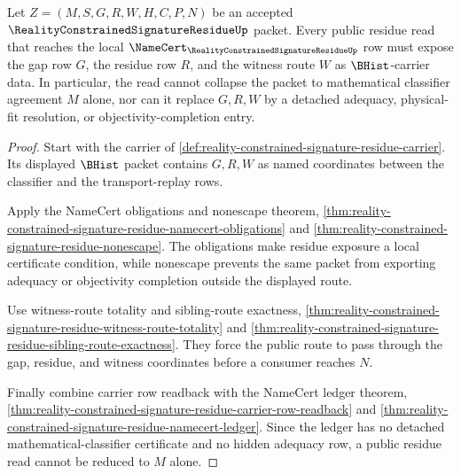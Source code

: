 \begin{theorem}
\label{thm:reality-constrained-signature-residue-gap-row-exhaustion}
Let $Z=(M,S,G,R,W,H,C,P,N)$ be an accepted $\RealityConstrainedSignatureResidueUp$ packet. Every public residue read that reaches the local $\NameCert_{\RealityConstrainedSignatureResidueUp}$ row must expose the gap row $G$, the residue row $R$, and the witness route $W$ as $\BHist$-carrier data. In particular, the read cannot collapse the packet to mathematical classifier agreement $M$ alone, nor can it replace $G,R,W$ by a detached adequacy, physical-fit resolution, or objectivity-completion entry.
\end{theorem}
\begin{proof}
Start with the carrier of \autoref{def:reality-constrained-signature-residue-carrier}. Its displayed $\BHist$ packet contains $G,R,W$ as named coordinates between the classifier and the transport-replay rows.

Apply the NameCert obligations and nonescape theorem,
\autoref{thm:reality-constrained-signature-residue-namecert-obligations} and
\autoref{thm:reality-constrained-signature-residue-nonescape}. The obligations make residue exposure a local certificate condition, while nonescape prevents the same packet from exporting adequacy or objectivity completion outside the displayed route.

Use witness-route totality and sibling-route exactness,
\autoref{thm:reality-constrained-signature-residue-witness-route-totality} and
\autoref{thm:reality-constrained-signature-residue-sibling-route-exactness}. They force the public route to pass through the gap, residue, and witness coordinates before a consumer reaches $N$.

Finally combine carrier row readback with the NameCert ledger theorem,
\autoref{thm:reality-constrained-signature-residue-carrier-row-readback} and
\autoref{thm:reality-constrained-signature-residue-namecert-ledger}. Since the ledger has no detached mathematical-classifier certificate and no hidden adequacy row, a public residue read cannot be reduced to $M$ alone.
\end{proof}

